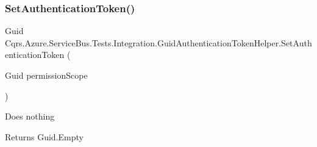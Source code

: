 \subsubsection{\texorpdfstring{Set\+Authentication\+Token()}{SetAuthenticationToken()}}
{\footnotesize\ttfamily Guid Cqrs.\+Azure.\+Service\+Bus.\+Tests.\+Integration.\+Guid\+Authentication\+Token\+Helper.\+Set\+Authentication\+Token (\begin{DoxyParamCaption}\item[{Guid}]{permission\+Scope }\end{DoxyParamCaption})}



Does nothing 

\begin{DoxyReturn}{Returns}
Guid.\+Empty
\end{DoxyReturn}
